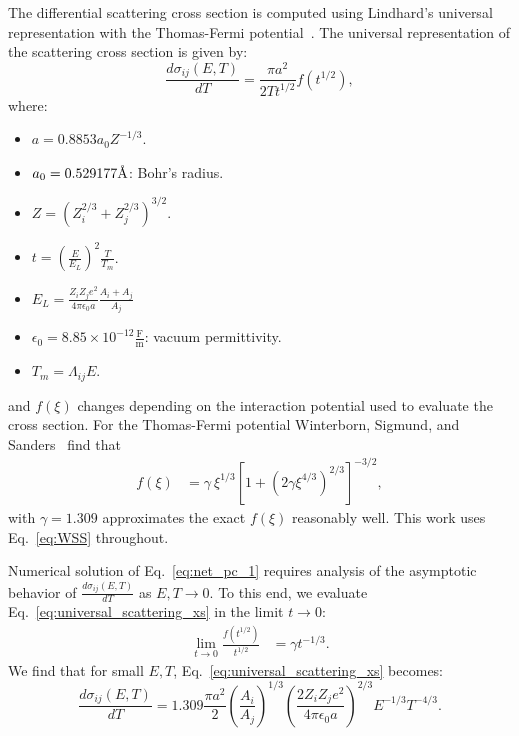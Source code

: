 \documentclass[letterpaper]{mandc2019}
\newcommand{\angstrom}{\text{\normalfont\AA}}
\begin{document}
The differential scattering cross section is computed using Lindhard's universal representation with the Thomas-Fermi potential~\cite{Lindhard1968}. The universal representation of the scattering cross section is given by:
\begin{equation}\label{eq:universal_scattering_xs}
   \frac{d \sigma_{ij}(E,T)}{dT} = \frac{\pi a^2}{2 T t^{1/2}} f(t^{1/2}),
\end{equation}
where:
\begin{multicols}{2}
\begin{itemize}
  \item $a = 0.8853 a_0 Z^{-1/3}$.
  \item $a_0=0.529177 \angstrom$: Bohr's radius.
  \item $Z =  (Z_i^{2/3} + Z_j^{2/3})^{3/2}$.
  \item $t = \left( \frac{E}{E_L} \right)^2 \frac{T}{T_m}$.
  \item $E_L = \frac{Z_i Z_j e^2}{4 \pi \epsilon_0 a} \frac{A_i + A_j}{A_j}$
  \item $\epsilon_0=8.85 \times10^{-12} \frac{\text{F}}{\text{m}}$: vacuum permittivity.
  \item $T_m = \Lambda_{ij} E$.
\end{itemize}
\end{multicols}
and $f(\xi)$ changes depending on the interaction potential used to evaluate the cross section. For the Thomas-Fermi potential Winterborn, Sigmund, and Sanders~\cite{WSS} find that
\begin{align}\label{eq:WSS}
  f(\xi) &= \gamma ~\xi^{1/3} \left[ 1 + \left( 2 \gamma \xi^{4/3} \right)^{2/3}\right]^{-3/2},
\end{align}
with $\gamma = 1.309$ approximates the exact $f(\xi)$ reasonably well. This work uses Eq.~\ref{eq:WSS} throughout.

Numerical solution of Eq.~\ref{eq:net_pc_1} requires analysis of the asymptotic behavior of $\frac{d \sigma_{ij}(E,T)}{dT}$ as $E, T \rightarrow 0$. To this end, we evaluate Eq.~\ref{eq:universal_scattering_xs} in the limit $t \rightarrow 0$:
\begin{align}
   \lim\limits_{t \rightarrow 0} \frac{f\left(t^{1/2}\right)}{t^{1/2}} &=\gamma t^{-1/3}.
\end{align}
We find that for small $E, T$, Eq.~\ref{eq:universal_scattering_xs} becomes:
\begin{equation}\label{eq:thomas_fermi_lowt}
  \frac{d \sigma_{ij}(E,T)}{dT} =1.309 \frac{\pi a^2}{2}  \left( \frac{A_i}{A_j}\right)^{1/3} \left( \frac{2 Z_i Z_j e^2}{4 \pi \epsilon_0 a} \right)^{2/3} E^{-1/3} T^{-4/3}.
\end{equation}
\end{document}
